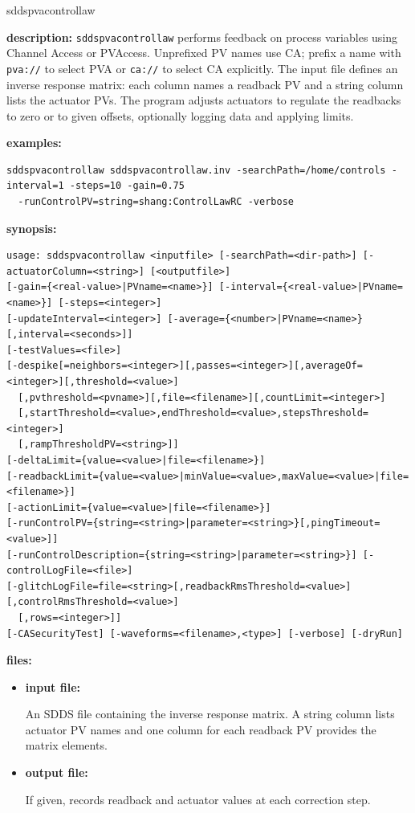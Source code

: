 %
\begin{sddsprog}{sddspvacontrollaw}
\item \textbf{description:}
\verb+sddspvacontrollaw+ performs feedback on process variables using Channel
Access or PVAccess. Unprefixed PV names use CA; prefix a name with
\verb+pva://+ to select PVA or \verb+ca://+ to select CA explicitly. The
input file defines an inverse response matrix: each column names a readback PV and a
string column lists the actuator PVs. The program adjusts actuators to regulate the
readbacks to zero or to given offsets, optionally logging data and applying limits.

\item \textbf{examples:}
\begin{verbatim}
sddspvacontrollaw sddspvacontrollaw.inv -searchPath=/home/controls -interval=1 -steps=10 -gain=0.75 
  -runControlPV=string=shang:ControlLawRC -verbose
\end{verbatim}

\item \textbf{synopsis:}
\begin{verbatim}
usage: sddspvacontrollaw <inputfile> [-searchPath=<dir-path>] [-actuatorColumn=<string>] [<outputfile>]
[-gain={<real-value>|PVname=<name>}] [-interval={<real-value>|PVname=<name>}] [-steps=<integer>]
[-updateInterval=<integer>] [-average={<number>|PVname=<name>}[,interval=<seconds>]]
[-testValues=<file>]
[-despike[=neighbors=<integer>][,passes=<integer>][,averageOf=<integer>][,threshold=<value>]
  [,pvthreshold=<pvname>][,file=<filename>][,countLimit=<integer>]
  [,startThreshold=<value>,endThreshold=<value>,stepsThreshold=<integer>]
  [,rampThresholdPV=<string>]]
[-deltaLimit={value=<value>|file=<filename>}]
[-readbackLimit={value=<value>|minValue=<value>,maxValue=<value>|file=<filename>}]
[-actionLimit={value=<value>|file=<filename>}]
[-runControlPV={string=<string>|parameter=<string>}[,pingTimeout=<value>]]
[-runControlDescription={string=<string>|parameter=<string>}] [-controlLogFile=<file>]
[-glitchLogFile=file=<string>[,readbackRmsThreshold=<value>][,controlRmsThreshold=<value>]
  [,rows=<integer>]]
[-CASecurityTest] [-waveforms=<filename>,<type>] [-verbose] [-dryRun]
\end{verbatim}

\item \textbf{files:}
\begin{itemize}
  \item \textbf{input file:} \par
    An SDDS file containing the inverse response matrix. A string column lists actuator PV names and one column for each readback PV provides the matrix elements.
  \item \textbf{output file:} \par
    If given, records readback and actuator values at each correction step.
\end{itemize}


\end{sddsprog}
